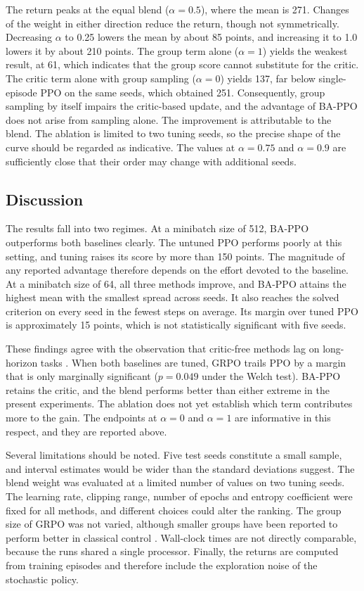 \documentclass[11pt,a4paper]{article}
\begin{document}
The return peaks at the equal blend ($\alpha = 0.5$), where the mean is 271. Changes of the weight in either direction reduce the return, though not symmetrically. Decreasing $\alpha$ to 0.25 lowers the mean by about 85 points, and increasing it to 1.0 lowers it by about 210 points. The group term alone ($\alpha = 1$) yields the weakest result, at 61, which indicates that the group score cannot substitute for the critic. The critic term alone with group sampling ($\alpha = 0$) yields 137, far below single-episode PPO on the same seeds, which obtained 251. Consequently, group sampling by itself impairs the critic-based update, and the advantage of BA-PPO does not arise from sampling alone. The improvement is attributable to the blend. The ablation is limited to two tuning seeds, so the precise shape of the curve should be regarded as indicative. The values at $\alpha = 0.75$ and $\alpha = 0.9$ are sufficiently close that their order may change with additional seeds.

\subsection{Discussion}
\label{sec:discussion}

The results fall into two regimes. At a minibatch size of 512, BA-PPO outperforms both baselines clearly. The untuned PPO performs poorly at this setting, and tuning raises its score by more than 150 points. The magnitude of any reported advantage therefore depends on the effort devoted to the baseline. At a minibatch size of 64, all three methods improve, and BA-PPO attains the highest mean with the smallest spread across seeds. It also reaches the solved criterion on every seed in the fewest steps on average. Its margin over tuned PPO is approximately 15 points, which is not statistically significant with five seeds.

These findings agree with the observation that critic-free methods lag on long-horizon tasks \cite{marquesdeoliveira2025critics}. When both baselines are tuned, GRPO trails PPO by a margin that is only marginally significant ($p = 0.049$ under the Welch test). BA-PPO retains the critic, and the blend performs better than either extreme in the present experiments. The ablation does not yet establish which term contributes more to the gain. The endpoints at $\alpha = 0$ and $\alpha = 1$ are informative in this respect, and they are reported above.

Several limitations should be noted. Five test seeds constitute a small sample, and interval estimates \cite{agarwal2021precipice} would be wider than the standard deviations suggest. The blend weight was evaluated at a limited number of values on two tuning seeds. The learning rate, clipping range, number of epochs and entropy coefficient were fixed for all methods, and different choices could alter the ranking. The group size of GRPO was not varied, although smaller groups have been reported to perform better in classical control \cite{marquesdeoliveira2025critics}. Wall-clock times are not directly comparable, because the runs shared a single processor. Finally, the returns are computed from training episodes and therefore include the exploration noise of the stochastic policy.
\end{document}
